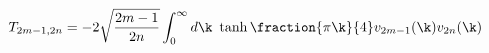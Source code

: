 \begin{equation}T_{2m-1,2n}= -2\sqrt{\frac{2m-1}{2n}}\int_0^\infty d\k\
\tanh \fraction{\pi \k}{4}
v_{2m-1}(\k)v_{2n}(\k)\label{eq:T-cont}\end{equation} 
